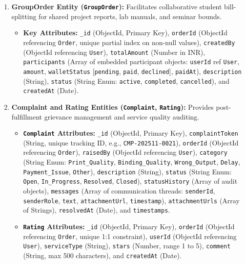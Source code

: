 \documentclass[12pt,a4paper]{report}
\begin{document}
\begin{enumerate}[leftmargin=0.35in, itemsep=4pt]
  \item \textbf{GroupOrder Entity (\texttt{GroupOrder}):}
  Facilitates collaborative student bill-splitting for shared project reports, lab manuals, and seminar bounds.
  \begin{itemize}[leftmargin=0.25in, itemsep=2pt]
    \item \textbf{Key Attributes:} \texttt{\_id} (ObjectId, Primary Key), \texttt{orderId} (ObjectId referencing \texttt{Order}, unique partial index on non-null values), \texttt{createdBy} (ObjectId referencing \texttt{User}), \texttt{totalAmount} (Number in INR), \texttt{participants} (Array of embedded participant objects: \texttt{userId} ref \texttt{User}, \texttt{amount}, \texttt{walletStatus} [\texttt{pending}, \texttt{paid}, \texttt{declined}], \texttt{paidAt}), \texttt{description} (String), \texttt{status} (String Enum: \texttt{active}, \texttt{completed}, \texttt{cancelled}), and \texttt{createdAt} (Date).
  \end{itemize}

  \item \textbf{Complaint and Rating Entities (\texttt{Complaint}, \texttt{Rating}):}
  Provides post-fulfillment grievance management and service quality auditing.
  \begin{itemize}[leftmargin=0.25in, itemsep=2pt]
    \item \textbf{\texttt{Complaint} Attributes:} \texttt{\_id} (ObjectId, Primary Key), \texttt{complaintToken} (String, unique tracking ID, e.g., \texttt{CMP-202511-0021}), \texttt{orderId} (ObjectId referencing \texttt{Order}), \texttt{raisedBy} (ObjectId referencing \texttt{User}), \texttt{category} (String Enum: \texttt{Print\_Quality}, \texttt{Binding\_Quality}, \texttt{Wrong\_Output}, \texttt{Delay}, \texttt{Payment\_Issue}, \texttt{Other}), \texttt{description} (String), \texttt{status} (String Enum: \texttt{Open}, \texttt{In\_Progress}, \texttt{Resolved}, \texttt{Closed}), \texttt{statusHistory} (Array of audit objects), \texttt{messages} (Array of communication threads: \texttt{senderId}, \texttt{senderRole}, \texttt{text}, \texttt{attachmentUrl}, \texttt{timestamp}), \texttt{attachmentUrls} (Array of Strings), \texttt{resolvedAt} (Date), and \texttt{timestamps}.
    \item \textbf{\texttt{Rating} Attributes:} \texttt{\_id} (ObjectId, Primary Key), \texttt{orderId} (ObjectId referencing \texttt{Order}, unique 1:1 constraint), \texttt{userId} (ObjectId referencing \texttt{User}), \texttt{serviceType} (String), \texttt{stars} (Number, range 1 to 5), \texttt{comment} (String, max 500 characters), and \texttt{createdAt} (Date).
  \end{itemize}


\end{enumerate}
\end{document}
